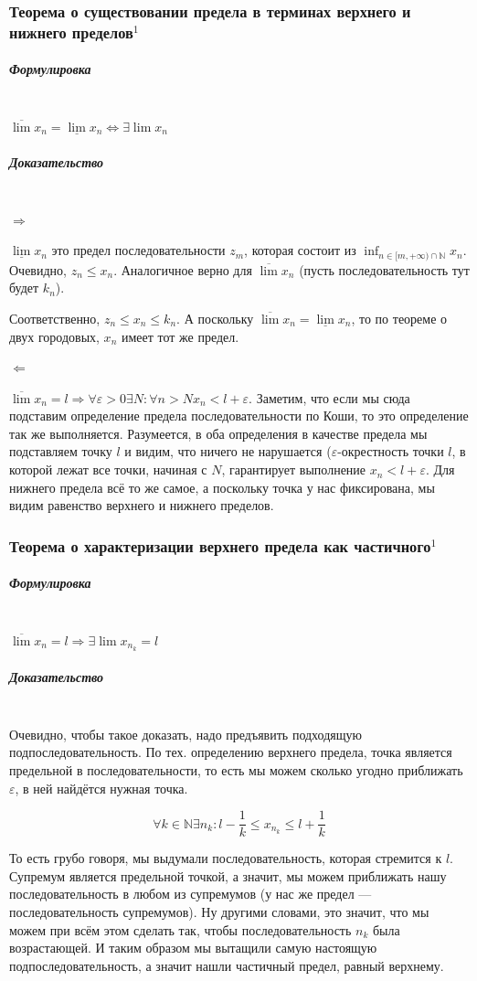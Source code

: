 \documentclass{article}
\let\vanillasubparagraph\subparagraph
\renewcommand{\subparagraph}[1]{\vanillasubparagraph{#1}\mbox{}\\}
\begin{document}
\subsubsection{Теорема о существовании предела в терминах верхнего и нижнего пределов\texorpdfstring{$^1$}{}}
\subparagraph{Формулировка}
$\overline{\lim}x_n = \underline{\lim}x_n \Leftrightarrow \exists \lim x_n$

\subparagraph{Доказательство}
$\Rightarrow$

$\underline{\lim}x_n$ это предел последовательности $z_m$, которая состоит из $\inf_{n\in [m, +\infty) \cap \mathbb{N}} x_n$. Очевидно, $z_n \le x_n$. Аналогичное верно для $\overline{\lim}x_n$ (пусть последовательность тут будет $k_n$). 

Соответственно, $z_n \le x_n \le k_n$. А поскольку $\overline{\lim}x_n = \underline{\lim}x_n$, то по теореме о двух городовых, $x_n$ имеет тот же предел.

$\Leftarrow$

$\overline{\lim}x_n = l \Rightarrow \forall \varepsilon > 0 \exists N : \forall n > N x_n < l + \varepsilon$. Заметим, что если мы сюда подставим определение предела последовательности по Коши, то это определение так же выполняется. Разумеется, в оба определения в качестве предела мы подставляем точку $l$ и видим, что ничего не нарушается ($\varepsilon$-окрестность точки $l$, в которой лежат все точки, начиная с $N$, гарантирует выполнение $x_n < l + \varepsilon$. Для нижнего предела всё то же самое, а поскольку точка у нас фиксирована, мы видим равенство верхнего и нижнего пределов.


\subsubsection{Теорема о характеризации верхнего предела как частичного\texorpdfstring{$^1$}{}}
\subparagraph{Формулировка}
$\overline{\lim}x_n = l \Rightarrow \exists \lim x_{n_k}=l$

\subparagraph{Доказательство}
Очевидно, чтобы такое доказать, надо предъявить подходящую подпоследовательность. По тех. определению верхнего предела, точка является предельной в последовательности, то есть мы можем сколько угодно приближать $\varepsilon$, в ней найдётся нужная точка.

$$
\forall k \in \mathbb{N} \exists n_k : l - \frac{1}{k} \le x_{n_k} \le l + \frac{1}{k}
$$

То есть грубо говоря, мы выдумали последовательность, которая стремится к $l$. Супремум является предельной точкой, а значит, мы можем приближать нашу последовательность в любом из супремумов (у нас же предел --- последовательность супремумов). Ну другими словами, это значит, что мы можем при всём этом сделать так, чтобы последовательность $n_k$ была возрастающей. И таким образом мы вытащили самую настоящую подпоследовательность, а значит нашли частичный предел, равный верхнему.
\end{document}
